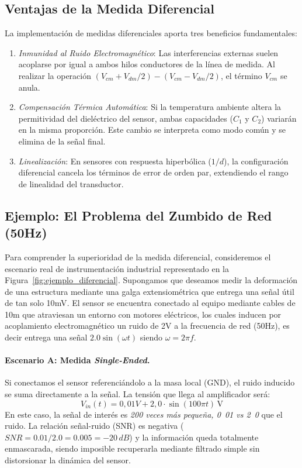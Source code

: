 \subsection{Ventajas de la Medida Diferencial}

La implementación de medidas diferenciales aporta tres beneficios fundamentales:

\begin{enumerate}
    \item \emph{Inmunidad al Ruido Electromagnético}: Las interferencias externas suelen acoplarse por igual a ambos hilos conductores de la línea de medida. Al realizar la operación $(V_{cm} + V_{dm}/2) - (V_{cm} - V_{dm}/2)$, el término $V_{cm}$ se anula.
    \item \emph{Compensación Térmica Automática}: Si la temperatura ambiente altera la permitividad del dieléctrico del sensor, ambas capacidades ($C_1$ y $C_2$) variarán en la misma proporción. Este cambio se interpreta como modo común y se elimina de la señal final.
    \item \emph{Linealización}: En sensores con respuesta hiperbólica ($1/d$), la configuración diferencial cancela los términos de error de orden par, extendiendo el rango de linealidad del transductor.
\end{enumerate}


\subsection{Ejemplo: El Problema del Zumbido de Red (\unit{50}{Hz})}\label{subsec:ejemplo_zumbido}

Para comprender la superioridad de la medida diferencial, consideremos el escenario real de instrumentación industrial representado en la Figura~\ref{fig:ejemplo_diferencial}. Supongamos que deseamos medir la deformación de una estructura mediante una galga extensiométrica que entrega una señal útil de tan solo \unit{10}{mV}. El sensor se encuentra conectado al equipo mediante cables de \unit{10}{m} que atraviesan un entorno con motores eléctricos, los cuales inducen por acoplamiento electromagnético un ruido de \unit{2}{V} a la frecuencia de red (\unit{50}{Hz}), es decir entrega una señal $2.0 \sin(\omega t)$ siendo $\omega = 2\pi f$.

\paragraph{Escenario A: Medida \textit{Single-Ended}.}
Si conectamos el sensor referenciándolo a la masa local (GND), el ruido inducido se suma directamente a la señal. La tensión que llega al amplificador será:
\begin{equation}
    V_{in}(t) = \unit{0,01}{V} + 2,0 \cdot \sin(100\pi t) \, \text{V}
\end{equation}
En este caso, la señal de interés es \emph{200 veces más pequeña, \unit{0.01} vs \unit{2.0}} que el ruido. La relación señal-ruido (SNR) es negativa ($SNR = 0.01/2.0 = 0.005 = -20 \, dB$) y la información queda totalmente enmascarada, siendo imposible recuperarla mediante filtrado simple sin distorsionar la dinámica del sensor.

